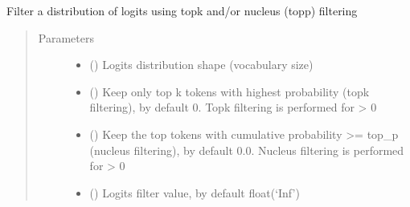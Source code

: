 \documentclass[letterpaper,10pt,english]{sphinxmanual}
\begin{document}
\begin{fulllineitems}
\begin{fulllineitems}
\label{\detokenize{code:gpt2_summarizer.GPT2Summarizer.top_k_top_p_filtering}}
\sphinxAtStartPar
Filter a distribution of logits using top\sphinxhyphen{}k and/or nucleus (top\sphinxhyphen{}p) filtering
\begin{quote}\begin{description}
\item[{Parameters}] \leavevmode\begin{itemize}
\item {} 
\sphinxAtStartPar
{} () \textendash{} Logits distribution shape (vocabulary size)

\item {} 
\sphinxAtStartPar
{} (\sphinxstyleliteralemphasis{\sphinxupquote{, }}) \textendash{} Keep only top k tokens with highest probability (top\sphinxhyphen{}k filtering), by default 0.
Top\sphinxhyphen{}k filtering is performed for  \textgreater{} 0

\item {} 
\sphinxAtStartPar
{} (\sphinxstyleliteralemphasis{\sphinxupquote{, }}) \textendash{} Keep the top tokens with cumulative probability \textgreater{}= top\_p (nucleus filtering), by default 0.0.
Nucleus filtering is performed for  \textgreater{} 0

\item {} 
\sphinxAtStartPar
{} (\sphinxstyleliteralemphasis{\sphinxupquote{, }}) \textendash{} Logits filter value, by default \sphinxhyphen{}float(‘Inf’)


\end{itemize}
\end{description}
\end{quote}
\end{fulllineitems}
\end{fulllineitems}
\end{document}
